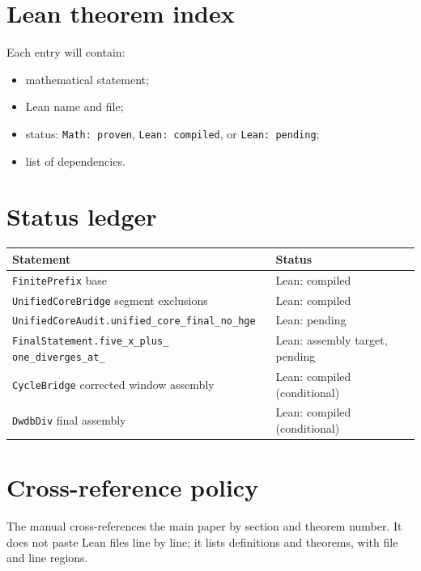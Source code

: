 \documentclass[11pt]{article}
\theoremstyle{plain}
\begin{document}
\section{Lean theorem index}

Each entry will contain:
\begin{itemize}[leftmargin=*]
\item mathematical statement;
\item Lean name and file;
\item status: \texttt{Math: proven}, \texttt{Lean: compiled}, or
  \texttt{Lean: pending};
\item list of dependencies.
\end{itemize}

\section{Status ledger}

\begin{center}
\begin{tabular}{ll}
\toprule
Statement & Status \\
\midrule
\texttt{FinitePrefix} base & Lean: compiled \\
\texttt{UnifiedCoreBridge} segment exclusions & Lean: compiled \\
\texttt{UnifiedCoreAudit.unified\_core\_final\_no\_hge} & Lean: pending \\
\texttt{FinalStatement.five\_\allowbreak x\_\allowbreak plus\_\allowbreak
one\_\allowbreak diverges\_\allowbreak at\_\allowbreak 7} &
Lean: assembly target, pending \\
\texttt{CycleBridge} corrected window assembly &
Lean: compiled (conditional) \\
\texttt{DwdbDiv} final assembly & Lean: compiled (conditional) \\
\bottomrule
\end{tabular}
\end{center}

\section{Cross-reference policy}

The manual cross-references the main paper by section and theorem
number.  It does not paste Lean files line by line; it lists definitions
and theorems, with file and line regions.
\end{document}

